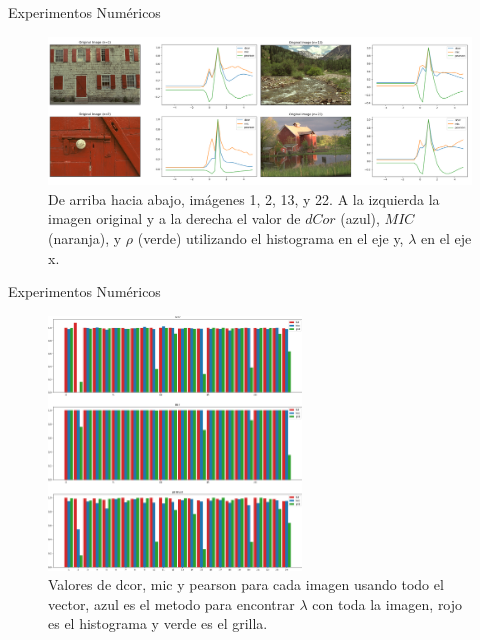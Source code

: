 \documentclass{beamer}
\begin{document}
\begin{frame}{Experimentos Numéricos}
    \begin{figure}[H]
        \centering
        \includegraphics[width=\textwidth]{lam_v_com_all_img_hist.png}
        \caption{De arriba hacia abajo, im\'agenes 1, 2, 13, y 22. A la izquierda la imagen original y a la derecha el valor de $dCor$ (azul), $MIC$ (naranja), y $\rho$ (verde) utilizando el histograma en el eje y, $\lambda$ en el eje x.}
    \end{figure}
\end{frame}

\begin{frame}{Experimentos Numéricos}
    \begin{figure}[H]
        \centering
        \includegraphics[width=0.6\textwidth]{plot_comparison_full.png}
        \caption{Valores de dcor, mic y pearson para cada imagen usando todo el vector, azul es el metodo para encontrar $\lambda$ con toda la imagen, rojo es el histograma y verde es el grilla.}
    \end{figure}
\end{frame}
\end{document}
